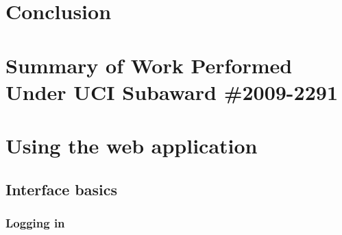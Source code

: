 \documentclass[12pt]{report}
\begin{document}
\chapter{Conclusion}
\label{chap:conclusion}









\appendix

\chapter{Summary of Work Performed Under UCI Subaward \#2009-2291}
\label{chap:actlog-sub}

\clearpage



\clearpage


\chapter{Using the web application}
\label{chap:user-guide}


\section{Interface basics}
\label{sec:ui-basics}

\subsection{Logging in}
\label{sec:ui-login}
\end{document}

